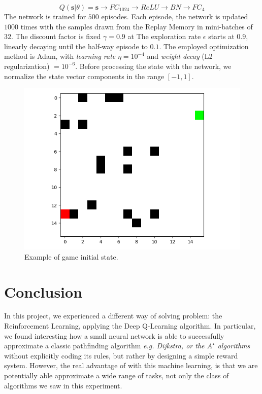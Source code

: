 \documentclass{article}
\begin{document}
\begin{equation}
\label{net}
	Q(\textbf{s}|\theta) = \textbf{s} \rightarrow FC_{1024} \rightarrow ReLU \rightarrow BN \rightarrow FC_{4}
\end{equation}
The network is trained for $500$ episodes. Each episode, the network is updated $1000$ times with the samples drawn from the Replay Memory in mini-batches of $32$. The discount factor is fixed $\gamma=0.9$ at The exploration rate $\epsilon$ starts at $0.9$, linearly decaying until the half-way episode to $0.1$. The employed optimization method is Adam, with \textit{learning rate} $\eta = 10^{-4}$ and \textit{weight decay} (L2 regularization) $= 10^{-6}$.
Before processing the state with the network, we normalize the state vector components in the range $[-1,1]$.
\begin{figure}[h!]
\centering
\includegraphics[width=\textwidth]{game_example}
\caption{Example of game initial state.}
\label{fig:game1}
\end{figure}

\section{Conclusion}
In this project, we experienced a different way of solving problem: the Reinforcement Learning, applying the Deep Q-Learning algorithm. In particular, we found interesting how a small neural network is able to successfully approximate a classic pathfinding algorithm \textit{e.g. Dijkstra, or the $A^\star$ algorithms} without explicitly coding its rules, but rather by designing a simple reward system. However, the real advantage of with this machine learning, is that we are potentially able approximate a wide range of tasks, not only the class of algorithms we saw in this experiment. 



\end{document}
